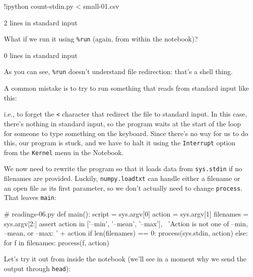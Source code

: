 \begin{VerbIn}
!ipython count-stdin.py < small-01.csv
\end{VerbIn}

\begin{VerbOut}
2 lines in standard input
\end{VerbOut}

What if we run it using \texttt{\%run} (again, from within the notebook)?

\begin{VerbIn}
\end{VerbIn}

\begin{VerbOut}
0 lines in standard input
\end{VerbOut}

As you can see, \texttt{\%run} doesn't understand file redirection:
that's a shell thing.

A common mistake is to try to run something that reads from standard
input like this:


i.e., to forget the \texttt{\textless{}} character that redirect the
file to standard input. In this case, there's nothing in standard input,
so the program waits at the start of the loop for someone to type
something on the keyboard. Since there's no way for us to do this, our
program is stuck, and we have to halt it using the \texttt{Interrupt}
option from the \texttt{Kernel} menu in the Notebook.

We now need to rewrite the program so that it loads data from
\texttt{sys.stdin} if no filenames are provided. Luckily,
\texttt{numpy.loadtxt} can handle either a filename or an open file as
its first parameter, so we don't actually need to change
\texttt{process}. That leaves \texttt{main}:

\begin{VerbIn}
# readings-06.py
def main():
    script = sys.argv[0]
    action = sys.argv[1]
    filenames = sys.argv[2:]
    assert action in ['--min', '--mean', '--max'], \
           'Action is not one of --min, --mean, or --max: ' + action
    if len(filenames) == 0:
        process(sys.stdin, action)
    else:
        for f in filenames:
            process(f, action)
\end{VerbIn}

Let's try it out from inside the notebook (we'll see in a moment why we send the output through
\texttt{head}):

